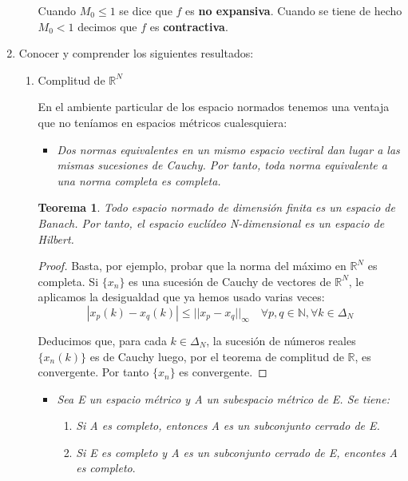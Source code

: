 \documentclass[a4paper, 12pt]{article}
\newtheorem{teorema}{Teorema}
\begin{document}
\begin{enumerate}[label=\textbf{\arabic*}.]
\begin{enumerate}[label=\textit{\alph*})]
	Cuando \(M_0 \leq 1\) se dice que \(f\) es \textbf{no expansiva}. Cuando se tiene de hecho \(M_0 < 1\) decimos que \(f\) es \textbf{contractiva}.
	\end{enumerate}
	
\bigskip

	\item Conocer y comprender los siguientes resultados:
	
	\begin{enumerate}[label=\textit{\alph*})]
		\item Complitud de \(\mathbb{R}^N\)
		
		En el ambiente particular de los espacio normados tenemos una ventaja que no teníamos en espacios métricos cualesquiera:
	\begin{itemize}
		\item \textit{Dos normas equivalentes en un mismo espacio vectiral dan lugar a las mismas sucesiones de Cauchy. Por tanto, toda norma equivalente a una norma completa es completa.}
	\end{itemize}
	
		\begin{teorema}
		Todo espacio normado de dimensión finita es un espacio de Banach. Por tanto, el espacio euclídeo N-dimensional es un espacio de Hilbert.
		\end{teorema}
		
		\begin{proof}
		Basta, por ejemplo, probar que la norma del máximo en \(\mathbb{R}^N\) es completa. Si \(\{x_n\}\) es una sucesión de Cauchy de vectores de \(\mathbb{R}^N\), le aplicamos la desigualdad que ya hemos usado varias veces:
		\[
			| x_p(k) - x_q (k)| \leq ||x_p - x_q ||_{\infty} \quad \forall p,q \in \mathbb{N}, \forall k \in \Delta_N
		\]
		
		Deducimos que, para cada \(k \in \Delta_N\), la sucesión de números reales \(\{x_n(k)\}\) es de Cauchy luego, por el teorema de complitud de \(\mathbb{R}\), es convergente. Por tanto \(\{x_n\}\) es convergente.
		\end{proof}
		
		\begin{itemize}
			\item \textit{Sea E un espacio métrico y A un subespacio métrico de E. Se tiene:}
			
			\begin{enumerate}[label=(\textit{\roman*})]
				\item \textit{Si A es completo, entonces A es un subconjunto cerrado de E.}
				\item \textit{Si E es completo y A es un subconjunto cerrado de E, encontes A es completo}.
			\end{enumerate}
		\end{itemize}
		

\end{enumerate}
\end{enumerate}
\end{document}

